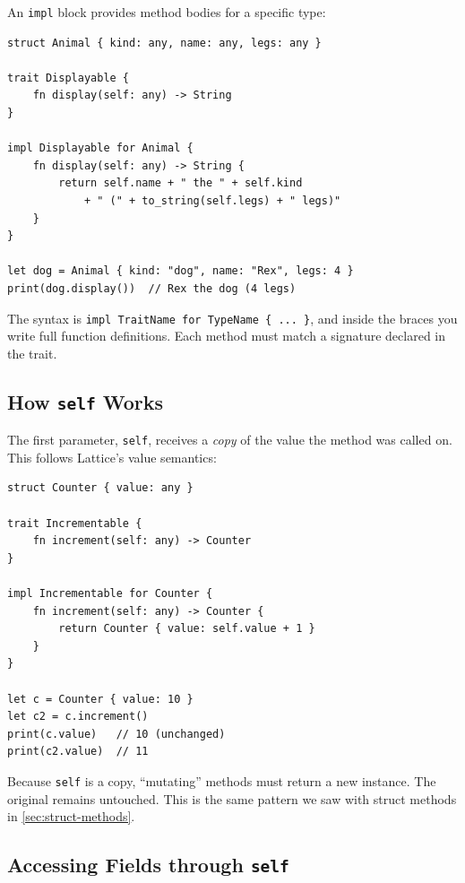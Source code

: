 An \lstinline|impl| block provides method bodies for a specific type:

\begin{lstlisting}[language=Lattice, caption={Implementing a trait}]
struct Animal { kind: any, name: any, legs: any }

trait Displayable {
    fn display(self: any) -> String
}

impl Displayable for Animal {
    fn display(self: any) -> String {
        return self.name + " the " + self.kind
            + " (" + to_string(self.legs) + " legs)"
    }
}

let dog = Animal { kind: "dog", name: "Rex", legs: 4 }
print(dog.display())  // Rex the dog (4 legs)
\end{lstlisting}

The syntax is \lstinline|impl TraitName for TypeName { ... }|, and inside
the braces you write full function definitions. Each method must match a
signature declared in the trait.

\subsection{How \texttt{self} Works}

The first parameter, \lstinline|self|, receives a \emph{copy} of the value
the method was called on. This follows Lattice's value semantics:

\begin{lstlisting}[language=Lattice, caption={Self is a copy}]
struct Counter { value: any }

trait Incrementable {
    fn increment(self: any) -> Counter
}

impl Incrementable for Counter {
    fn increment(self: any) -> Counter {
        return Counter { value: self.value + 1 }
    }
}

let c = Counter { value: 10 }
let c2 = c.increment()
print(c.value)   // 10 (unchanged)
print(c2.value)  // 11
\end{lstlisting}

Because \lstinline|self| is a copy, ``mutating'' methods must return a new
instance. The original remains untouched. This is the same pattern we saw
with struct methods in \cref{sec:struct-methods}.

\subsection{Accessing Fields through \texttt{self}}


